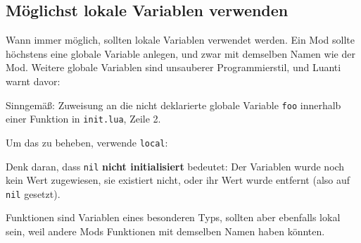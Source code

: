 \subsection{Möglichst lokale Variablen
verwenden}\label{muxf6glichst-lokale-variablen-verwenden}

Wann immer möglich, sollten lokale Variablen verwendet werden. Ein Mod
sollte höchstens eine globale Variable anlegen, und zwar mit demselben
Namen wie der Mod. Weitere globale Variablen sind unsauberer
Programmierstil, und Luanti warnt davor:

\begin{Shaded}
\begin{Highlighting}[]
\end{Highlighting}
\end{Shaded}

Sinngemäß: Zuweisung an die nicht deklarierte globale Variable
\texttt{foo} innerhalb einer Funktion in
\texttt{init.\allowbreak{}lua},
Zeile 2.

Um das zu beheben, verwende \texttt{local}:

\begin{Shaded}
\begin{Highlighting}[]
\OperatorTok{()}
      \OperatorTok{=} 

\OperatorTok{()}
    \OperatorTok{(}\OperatorTok{(}\OperatorTok{))} 

\OperatorTok{()}
\OperatorTok{()}
\end{Highlighting}
\end{Shaded}

Denk daran, dass \texttt{nil} \textbf{nicht initialisiert} bedeutet: Der
Variablen wurde noch kein Wert zugewiesen, sie existiert nicht, oder ihr
Wert wurde entfernt (also auf \texttt{nil} gesetzt).

Funktionen sind Variablen eines besonderen Typs, sollten aber ebenfalls
lokal sein, weil andere Mods Funktionen mit demselben Namen haben
könnten.

\begin{Shaded}
\begin{Highlighting}[]
 \OperatorTok{(}\OperatorTok{)}
      \OperatorTok{*} 
\end{Highlighting}
\end{Shaded}

